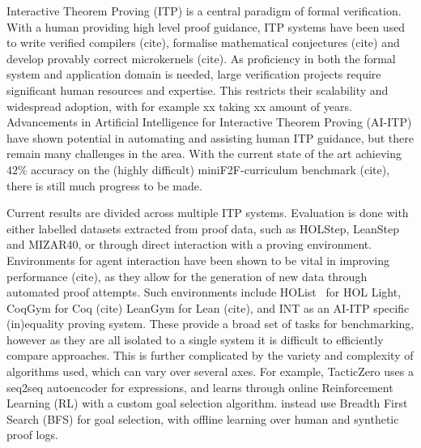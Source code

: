 \documentclass[letterpaper]{article} %
\begin{document}
    Interactive Theorem Proving (ITP) is a central paradigm of formal verification.
    With a human providing high level proof guidance, ITP systems have been used to write verified compilers (cite),
    formalise mathematical conjectures (cite) and develop provably correct microkernels (cite).
    As proficiency in both the formal system and application domain is needed,
    large verification projects require significant human resources and expertise.
    This restricts their scalability and widespread adoption, with for example xx taking xx amount of years.
    Advancements in Artificial Intelligence for Interactive Theorem Proving (AI-ITP) have shown potential in automating
    and assisting human ITP guidance, but there remain many challenges in the area.
    With the current state of the art achieving $42\%$ accuracy on the (highly difficult) miniF2F-curriculum benchmark (cite),
    there is still much progress to be made.


    Current results are divided across multiple ITP systems.
    Evaluation is done with either labelled datasets extracted from proof data, such as HOLStep, LeanStep and MIZAR40,
    or through direct interaction with a proving environment.
    Environments for agent interaction have been shown to be vital in improving performance (cite),
    as they allow for the generation of new data through automated proof attempts.
    Such environments include HOList~\cite{bansal_holist_2019} for HOL Light, CoqGym for Coq (cite)
    LeanGym for Lean (cite), and INT as an AI-ITP specific (in)equality proving system.
    These provide a broad set of tasks for benchmarking, however as they are all isolated to a single system
    it is difficult to efficiently compare approaches.
    This is further complicated by the variety and complexity of algorithms used, which can vary over several axes.
    For example, TacticZero \cite{wu_tacticzero_2021} uses a seq2seq autoencoder for expressions,
    and learns through online Reinforcement Learning (RL) with a custom goal selection algorithm.
    \cite{bansal_holist_2019} instead use Breadth First Search (BFS) for goal selection,
    with offline learning over human and synthetic proof logs.
\end{document}
